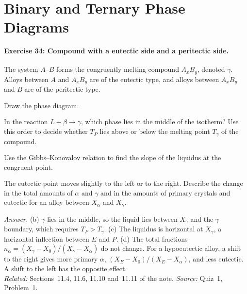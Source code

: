 \documentclass[11pt]{article}      %
\numberwithin{equation}{section}   %
\begin{document}
\section{Binary and Ternary Phase Diagrams}

\paragraph{Exercise 34: Compound with a eutectic side and a peritectic side.}
The system $A$--$B$ forms the congruently melting compound $A_xB_y$, denoted $\gamma$. Alloys between $A$ and $A_xB_y$ are of the eutectic type, and alloys between $A_xB_y$ and $B$ are of the peritectic type.
\begin{parts}
    \item Draw the phase diagram.
    \item In the reaction $L + \beta \to \gamma$, which phase lies in the middle of the isotherm? Use this order to decide whether $T_P$ lies above or below the melting point $T_\gamma$ of the compound.
    \item Use the Gibbs--Konovalov relation to find the slope of the liquidus at the congruent point.
    \item The eutectic point moves slightly to the left or to the right. Describe the change in the total amounts of $\alpha$ and $\gamma$ and in the amounts of primary crystals and eutectic for an alloy between $X_\alpha$ and $X_\gamma$.
\end{parts}
\textit{Answer.} (b) $\gamma$ lies in the middle, so the liquid lies between $X_\gamma$ and the $\gamma$ boundary, which requires $T_P > T_\gamma$. (c) The liquidus is horizontal at $X_\gamma$, a horizontal inflection between $E$ and $P$. (d) The total fractions $n_\alpha = (X_\gamma - X_0)/(X_\gamma - X_\alpha)$ do not change. For a hypoeutectic alloy, a shift to the right gives more primary $\alpha$, $(X_E - X_0)/(X_E - X_\alpha)$, and less eutectic. A shift to the left has the opposite effect.\\
\textit{Related:} Sections~11.4, 11.6, 11.10 and~11.11 of the note. \textit{Source:} Quiz~1, Problem~1.

\needspace{302pt}
\end{document}
